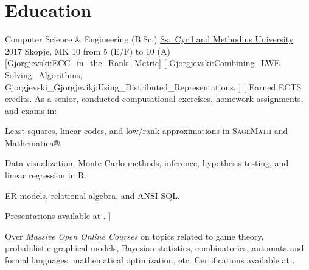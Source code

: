 \documentclass[%
version=last,%
fontsize=11pt,%
paper=A4,%
headinclude=false,%
footinclude=false,%
headlines=0,%
footlines=0,%
areasetadvanced,%
toc=bibnumbered,%
]{scrartcl}%
\begin{document}
\begin{minipage}[t]{.575\textwidth}
  \section{Education}%
  \label{sec:education}
  \EducationEntry%
  {Computer Science \& Engineering (B.Sc.)}%
  {\href{http://ukim.edu.mk/}{Ss.\ Cyril and Methodius University}}%
  {2017}%
  {Skopje, MK}%
  {10}%
  {from 5 (E/F) to 10 (A)}%
  [Gjorgjevski:ECC_in_the_Rank_Metric]%
  [%
  Gjorgjevski:Combining_LWE-Solving_Algorithms,%
  Gjorgjevski_Gjorgjevikj:Using_Distributed_Representations,%
  ]%
  [%
  Earned  ECTS credits.  As a senior, conducted computational
  exercises, homework assignments, and exams in:
  \begin{description}[%
    leftmargin=*, font=\normalfont\itshape,%
    widest=Linear Algebra,%
    ]
  \item[Linear Algebra] Least squares, linear codes, and low\-/rank
    approximations in \textsc{SageMath} and Mathematica®.
  \item[Statistics] Data visualization, Monte Carlo methods, inference,
    hypothesis testing, and linear regression in R.
  \item[Databases] ER models, relational algebra, and ANSI SQL\@.
  \end{description}
  Presentations available at .%
  ]

  \begin{tcolorbox}[size=fbox, fontlower=\small]
    Over  \emph{Massive Open Online Courses} on topics related
    to game theory, probabilistic graphical models, Bayesian statistics,
    combinatorics, automata and formal languages, mathematical optimization,
    etc.%
    \tcblower%
    Certifications available at
    .
  \end{tcolorbox}

  \printbibliography[type=thesis, title=Theses]%
  \printbibliography[nottype=thesis, title=Publications]
\end{minipage}%
\hfill%
\end{document}
